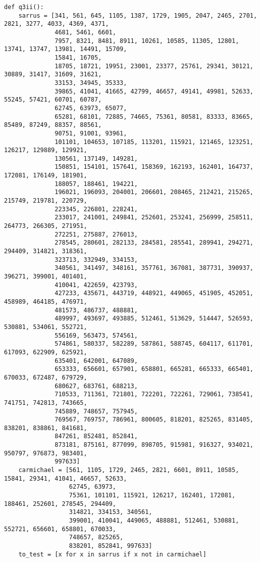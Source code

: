 \documentclass[10pt,a4paper]{report}
\begin{document}
\begin{verbatim}
def q3ii():
    sarrus = [341, 561, 645, 1105, 1387, 1729, 1905, 2047, 2465, 2701, 2821, 3277, 4033, 4369, 4371,
              4681, 5461, 6601,
              7957, 8321, 8481, 8911, 10261, 10585, 11305, 12801, 13741, 13747, 13981, 14491, 15709,
              15841, 16705,
              18705, 18721, 19951, 23001, 23377, 25761, 29341, 30121, 30889, 31417, 31609, 31621,
              33153, 34945, 35333,
              39865, 41041, 41665, 42799, 46657, 49141, 49981, 52633, 55245, 57421, 60701, 60787,
              62745, 63973, 65077,
              65281, 68101, 72885, 74665, 75361, 80581, 83333, 83665, 85489, 87249, 88357, 88561,
              90751, 91001, 93961,
              101101, 104653, 107185, 113201, 115921, 121465, 123251, 126217, 129889, 129921,
              130561, 137149, 149281,
              150851, 154101, 157641, 158369, 162193, 162401, 164737, 172081, 176149, 181901,
              188057, 188461, 194221,
              196021, 196093, 204001, 206601, 208465, 212421, 215265, 215749, 219781, 220729,
              223345, 226801, 228241,
              233017, 241001, 249841, 252601, 253241, 256999, 258511, 264773, 266305, 271951,
              272251, 275887, 276013,
              278545, 280601, 282133, 284581, 285541, 289941, 294271, 294409, 314821, 318361,
              323713, 332949, 334153,
              340561, 341497, 348161, 357761, 367081, 387731, 390937, 396271, 399001, 401401,
              410041, 422659, 423793,
              427233, 435671, 443719, 448921, 449065, 451905, 452051, 458989, 464185, 476971,
              481573, 486737, 488881,
              489997, 493697, 493885, 512461, 513629, 514447, 526593, 530881, 534061, 552721,
              556169, 563473, 574561,
              574861, 580337, 582289, 587861, 588745, 604117, 611701, 617093, 622909, 625921,
              635401, 642001, 647089,
              653333, 656601, 657901, 658801, 665281, 665333, 665401, 670033, 672487, 679729,
              680627, 683761, 688213,
              710533, 711361, 721801, 722201, 722261, 729061, 738541, 741751, 742813, 743665,
              745889, 748657, 757945,
              769567, 769757, 786961, 800605, 818201, 825265, 831405, 838201, 838861, 841681,
              847261, 852481, 852841,
              873181, 875161, 877099, 898705, 915981, 916327, 934021, 950797, 976873, 983401,
              997633]
    carmichael = [561, 1105, 1729, 2465, 2821, 6601, 8911, 10585, 15841, 29341, 41041, 46657, 52633,
                  62745, 63973,
                  75361, 101101, 115921, 126217, 162401, 172081, 188461, 252601, 278545, 294409,
                  314821, 334153, 340561,
                  399001, 410041, 449065, 488881, 512461, 530881, 552721, 656601, 658801, 670033,
                  748657, 825265,
                  838201, 852841, 997633]
    to_test = [x for x in sarrus if x not in carmichael]


\end{verbatim}
\end{document}
